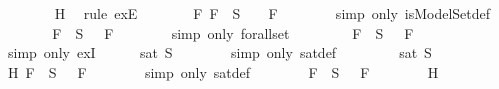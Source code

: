 \begin{isabellebody}
\ \ \ \ \ \ \isamarkupfalse%
\ H{}\ \isamarkupfalse%
\ {\isacharparenleft}rule\ exE{\isacharparenright}\isanewline
\ \ \ \ \isamarkupfalse%
\ \isamarkupfalse%
\ {\isachardoublequoteopen}{\isasymforall}F{\isachardot}\ {\isacharparenleft}F\ {\isasymin}\ S\ {\isasymlongrightarrow}\ {\isasymA}\ {\isasymTurnstile}\ F{\isacharparenright}{\isachardoublequoteclose}\isanewline
\ \ \ \ \ \ \isamarkupfalse%
\ {\isacharparenleft}simp\ only{\isacharcolon}\ isModelSet{\isacharunderscore}def{\isacharparenright}\isanewline
\ \ \ \ \isamarkupfalse%
\ \isamarkupfalse%
\ {\isachardoublequoteopen}{\isasymforall}F\ {\isasymin}\ S{\isachardot}\ {\isasymA}\ {\isasymTurnstile}\ F{\isachardoublequoteclose}\isanewline
\ \ \ \ \ \ \isamarkupfalse%
\ {\isacharparenleft}simp\ only{\isacharcolon}\ forall{\isacharunderscore}set{\isacharparenright}\isanewline
\ \ \ \ \isamarkupfalse%
\ \isamarkupfalse%
\ {\isachardoublequoteopen}{\isasymexists}{\isasymA}{\isachardot}\ {\isasymforall}F\ {\isasymin}\ S{\isachardot}\ {\isasymA}\ {\isasymTurnstile}\ F{\isachardoublequoteclose}\ \isanewline
\ \ \ \ \ \ \isamarkupfalse%
\ {\isacharparenleft}simp\ only{\isacharcolon}\ exI{\isacharparenright}\isanewline
\ \ \ \ \isamarkupfalse%
\ {\isachardoublequoteopen}sat\ S{\isachardoublequoteclose}\isanewline
\ \ \ \ \ \ \isamarkupfalse%
\ {\isacharparenleft}simp\ only{\isacharcolon}\ sat{\isacharunderscore}def{\isacharparenright}\isanewline
\ \ \isamarkupfalse%
\isanewline
\ \ \ \ \isamarkupfalse%
\ {\isachardoublequoteopen}sat\ S{\isachardoublequoteclose}\isanewline
\ \ \ \ \isamarkupfalse%
\ \isamarkupfalse%
\ H{}{\isacharcolon}{\isachardoublequoteopen}{\isasymexists}{\isasymA}{\isachardot}\ {\isasymforall}F\ {\isasymin}\ S{\isachardot}\ {\isasymA}\ {\isasymTurnstile}\ F{\isachardoublequoteclose}\isanewline
\ \ \ \ \ \ \isamarkupfalse%
\ {\isacharparenleft}simp\ only{\isacharcolon}\ sat{\isacharunderscore}def{\isacharparenright}\isanewline
\ \ \ \ \isamarkupfalse%
\ {\isachardoublequoteopen}{\isasymA}{\isachardoublequoteclose}\ \ {\isachardoublequoteopen}{\isasymforall}F\ {\isasymin}\ S{\isachardot}\ {\isasymA}\ {\isasymTurnstile}\ F{\isachardoublequoteclose}\isanewline
\ \ \ \ \ \ \isamarkupfalse%
\ H{}\ \isamarkupfalse%

\end{isabellebody}
